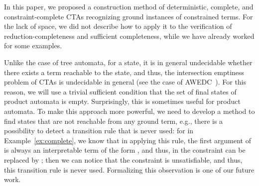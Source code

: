 \documentclass[copyright,creativecommons]{eptcs}
\begin{document}
In this paper, we proposed a construction method of deterministic,
complete, and constraint-complete CTAs recognizing ground instances of
constrained terms. 
For the lack of space, we did not describe how to apply it to the
verification of reduction-completeness and sufficient completeness,
while we have already worked for some examples. 

Unlike the case of tree automata, for a state, it is in general
undecidable whether there exists a term reachable to the state, and
thus, the intersection emptiness problem of CTAs is
undecidable in general (see the case of
AWEDC~\cite[Theorem~4.2.10]{TATA}).
For this reason, we will use a trivial sufficient condition that the set
of final states of product automata is empty. 
Surprisingly, this is sometimes useful for product automata. 
To make this approach more powerful, we need to develop a method to
find states that are not reachable from any ground term, e.g., there is
a possibility to detect a transition rule that is never used:
for  in
	 Example~\ref{ex:complete},
we know that in applying this rule, the first argument of 
is always an interpretable term of the form , and thus,
 in the constraint can be replaced by
;
then we can notice that the constraint is unsatisfiable, and thus, this
transition rule is never used. 
Formalizing this observation is one of our future work. 
\end{document}
